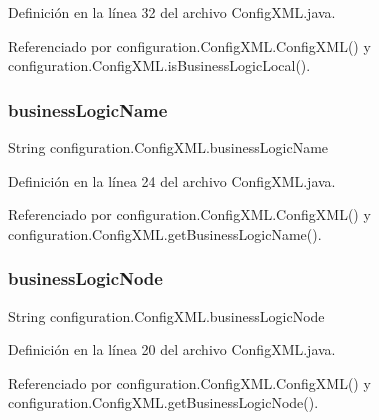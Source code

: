 Definición en la línea 32 del archivo Config\+X\+M\+L.\+java.



Referenciado por configuration.\+Config\+X\+M\+L.\+Config\+X\+M\+L() y configuration.\+Config\+X\+M\+L.\+is\+Business\+Logic\+Local().

\mbox{\label{classconfiguration_1_1ConfigXML_ad0228d23b69947a3e6ad84db4d893369}} 
\subsubsection{\texorpdfstring{businessLogicName}{businessLogicName}}
{\footnotesize\ttfamily String configuration.\+Config\+X\+M\+L.\+business\+Logic\+Name\hspace{0.3cm}{\ttfamily [private]}}



Definición en la línea 24 del archivo Config\+X\+M\+L.\+java.



Referenciado por configuration.\+Config\+X\+M\+L.\+Config\+X\+M\+L() y configuration.\+Config\+X\+M\+L.\+get\+Business\+Logic\+Name().

\mbox{\label{classconfiguration_1_1ConfigXML_a8eaef059e5c5b7dc23331ba72c04eb59}} 
\subsubsection{\texorpdfstring{businessLogicNode}{businessLogicNode}}
{\footnotesize\ttfamily String configuration.\+Config\+X\+M\+L.\+business\+Logic\+Node\hspace{0.3cm}{\ttfamily [private]}}



Definición en la línea 20 del archivo Config\+X\+M\+L.\+java.



Referenciado por configuration.\+Config\+X\+M\+L.\+Config\+X\+M\+L() y configuration.\+Config\+X\+M\+L.\+get\+Business\+Logic\+Node().

